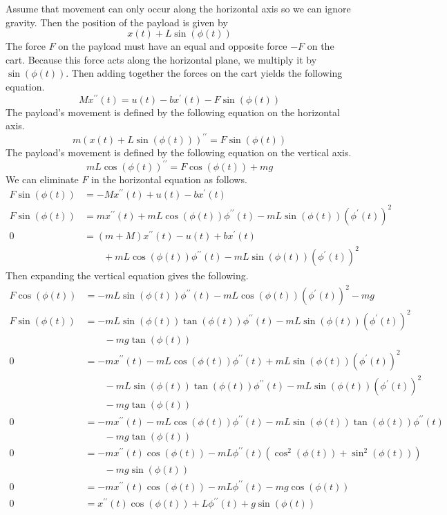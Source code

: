\documentclass[12pt]{article}
\begin{document}
Assume that movement can only occur along the horizontal axis so we can ignore gravity. Then the position of the payload is given by
\[x(t)+L\sin(\phi(t))\]
The force \(F\) on the payload must have an equal and opposite force \(-F\) on the cart. Because this force acts along the horizontal plane, we
multiply it by \(\sin(\phi(t))\). Then adding together the forces on the cart yields
the following equation.
\[Mx^{\prime\prime}(t)=u(t)-bx^{\prime}(t)-F\sin(\phi(t))\]
The payload's movement is defined by the following equation on the horizontal axis.
\[m(x(t)+L\sin(\phi(t)))^{\prime\prime} = F\sin(\phi(t))\]
The payload's movement is defined by the following equation on the vertical axis.
\[mL\cos(\phi(t))^{\prime\prime} = F\cos(\phi(t)) + mg\]
We can eliminate \(F\) in the horizontal equation as follows.
\begin{align*}
    F\sin(\phi(t))&=-Mx^{\prime\prime}(t)+u(t)-bx^{\prime}(t)\\
    F\sin(\phi(t))&=mx^{\prime\prime}(t)+mL\cos(\phi(t))\phi^{\prime\prime}(t)-mL\sin(\phi(t))(\phi^\prime(t))^2\\
    0&=(m+M)x^{\prime\prime}(t)-u(t)+bx^{\prime}(t)\\
    &\qquad +mL\cos(\phi(t))\phi^{\prime\prime}(t)-mL\sin(\phi(t))(\phi^\prime(t))^2
\end{align*}
Then expanding the vertical equation gives the following.
\begin{align*}
    F\cos(\phi(t))&=-mL\sin(\phi(t))\phi^{\prime\prime}(t)-mL\cos(\phi(t))(\phi^\prime(t))^2-mg\\
    F\sin(\phi(t))&=-mL\sin(\phi(t))\tan(\phi(t))\phi^{\prime\prime}(t)-mL\sin(\phi(t))(\phi^\prime(t))^2\\
    &\qquad- mg\tan(\phi(t))\\
    0&=-mx^{\prime\prime}(t)-mL\cos(\phi(t))\phi^{\prime\prime}(t)+mL\sin(\phi(t))(\phi^\prime(t))^2\\
    &\qquad -mL\sin(\phi(t))\tan(\phi(t))\phi^{\prime\prime}(t)-mL\sin(\phi(t))(\phi^\prime(t))^2\\
    &\qquad - mg\tan(\phi(t))\\
    0&=-mx^{\prime\prime}(t)-mL\cos(\phi(t))\phi^{\prime\prime}(t)-mL\sin(\phi(t))\tan(\phi(t))\phi^{\prime\prime}(t)\\
    &\qquad- mg\tan(\phi(t))\\
    0&=-mx^{\prime\prime}(t)\cos(\phi(t)) - mL\phi^{\prime\prime}(t)(\cos^2(\phi(t))+\sin^2(\phi(t)))\\
    &\qquad- mg\sin(\phi(t))\\
    0&=-mx^{\prime\prime}(t)\cos(\phi(t)) - mL\phi^{\prime\prime}(t)-mg\cos(\phi(t))\\
    0&=x^{\prime\prime}(t)\cos(\phi(t))+L\phi^{\prime\prime}(t)+g\sin(\phi(t))
\end{align*}
\end{document}
